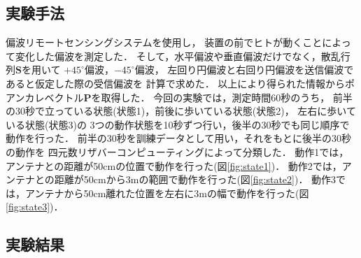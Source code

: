 \documentclass[uplatex,a4paper,12pt]{jsarticle}
\begin{document}
\subsection{実験手法}
偏波リモートセンシングシステムを使用し，
装置の前でヒトが動くことによって変化した偏波を測定した．
そして，水平偏波や垂直偏波だけでなく，散乱行列$\bm{S}$を用いて
$+45^\circ$偏波，$-45^\circ$偏波，
左回り円偏波と右回り円偏波を送信偏波であると仮定した際の受信偏波を
計算で求めた．
以上により得られた情報からポアンカレベクトル$\bm{P}$を取得した．
今回の実験では，測定時間60秒のうち，
前半の30秒で立っている状態(状態1)，前後に歩いている状態(状態2)，
左右に歩いている状態(状態3)の
3つの動作状態を10秒ずつ行い，後半の30秒でも同じ順序で動作を行った．
前半の30秒を訓練データとして用い，それをもとに後半の30秒の動作を
四元数リザバーコンピューティングによって分類した．
動作1では，アンテナとの距離が50cmの位置で動作を行った(図\ref{fig:state1})．
動作2では，アンテナとの距離が50cmから3mの範囲で動作を行った(図\ref{fig:state2})．
動作3では，アンテナから50cm離れた位置を左右に3mの幅で動作を行った(図\ref{fig:state3})．

\subsection{実験結果}
\end{document}
